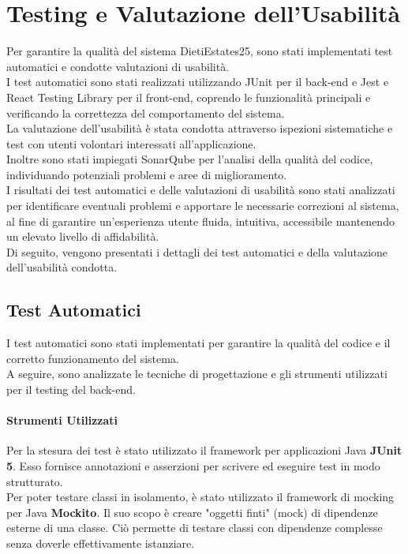 \documentclass{book}
\begin{document}
\chapter{Testing e Valutazione dell'Usabilità}
Per garantire la qualità del sistema DietiEstates25, sono stati implementati test automatici e condotte valutazioni di usabilità.\\
I test automatici sono stati realizzati utilizzando JUnit per il back-end e Jest e React Testing Library per il front-end, coprendo le funzionalità principali e verificando la correttezza del comportamento del sistema.\\
La valutazione dell'usabilità è stata condotta attraverso ispezioni sistematiche e test con utenti volontari interessati all'applicazione.\\
Inoltre sono stati impiegati SonarQube per l'analisi della qualità del codice, individuando potenziali problemi e aree di miglioramento.\\
I risultati dei test automatici e delle valutazioni di usabilità sono stati analizzati per identificare eventuali problemi e apportare le necessarie correzioni al sistema, al fine di garantire un'esperienza utente fluida, intuitiva, accessibile mantenendo un elevato livello di affidabilità.\\
Di seguito, vengono presentati i dettagli dei test automatici e della valutazione dell'usabilità condotta.

\section{Test Automatici}
I test automatici sono stati implementati per garantire la qualità del codice e il corretto funzionamento del sistema.\\
A seguire, sono analizzate le tecniche di progettazione e gli strumenti utilizzati per il testing del back-end.

\subsubsection{Strumenti Utilizzati}
Per la stesura dei test è stato utilizzato il framework per applicazioni Java \textbf{JUnit 5}. Esso fornisce annotazioni e asserzioni per scrivere ed eseguire test in modo strutturato.\\
Per poter testare classi in isolamento, è stato utilizzato il framework di mocking per Java \textbf{Mockito}. Il suo scopo è creare "oggetti finti" (mock) di dipendenze esterne di una classe. Ciò permette di testare classi con dipendenze complesse senza doverle effettivamente istanziare.
\end{document}
